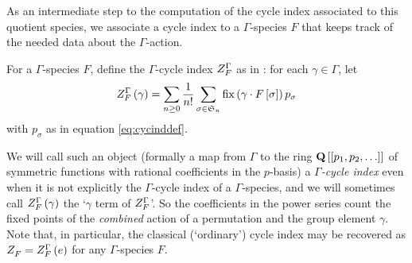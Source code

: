 \documentclass[sectionflow,singlespace,twoside,boldmathhdr,draft]{brandiss} %
\numberwithin{section}{chapter}
\numberwithin{figure}{chapter}
\begin{document}
As an intermediate step to the computation of the cycle index associated to this quotient species, we associate a cycle index to a $\Gamma$-species $F$ that keeps track of the needed data about the $\Gamma$-action.
\begin{definition}
  \label{def:gcycind}
  For a $\Gamma$-species $F$, define the $\Gamma$-cycle index $ Z_{F}^{{\Gamma} {}} $ as in \cite{hend:specfield}: for each $\gamma \in \Gamma$, let
  \begin{equation}
     Z_{F}^{{\Gamma} {}}  \left( {\gamma} \right) = \sum_{n \geq 0} \frac{1}{n!} \sum_{\sigma \in  \mathfrak{S}_{n} } \operatorname{fix} \left( {\gamma \cdot F \left[ {\sigma} \right]} \right) p_{\sigma} \label{eq:gcycinddef}
  \end{equation}
  with $p_{\sigma}$ as in equation \eqref{eq:cycinddef}.
\end{definition}

We will call such an object (formally a map from $\Gamma$ to the ring $\mathbf{Q} \left[ {\left[ {p_{1}, p_{2}, \dots} \right]} \right]$ of symmetric functions with rational coefficients in the $p$-basis) a \emph{$\Gamma$-cycle index} even when it is not explicitly the $\Gamma$-cycle index of a $\Gamma$-species, and we will sometimes call $ Z_{F}^{{\Gamma} {}}  \left( {\gamma} \right)$ the `$\gamma$ term of $ Z_{F}^{{\Gamma} {}} $'.
So the coefficients in the power series count the fixed points of the \emph{combined} action of a permutation and the group element $\gamma$.
Note that, in particular, the classical (`ordinary') cycle index may be recovered as $ Z_{F}^{}  =  Z_{F}^{{\Gamma} {}}  \left( {e} \right)$ for any $\Gamma$-species $F$.
\end{document}
